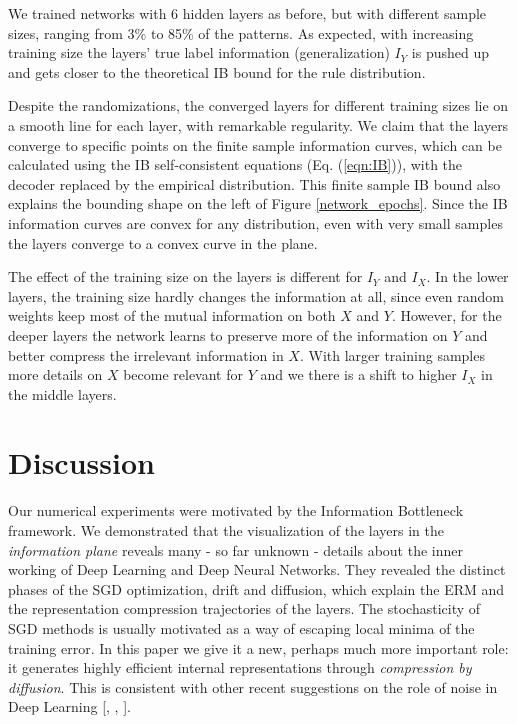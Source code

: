 \documentclass[11pt]{article}
\begin{document}
We trained networks with 6 hidden layers as before, but with different sample sizes, ranging from 3\% to 85\% of the patterns.  
As expected, with increasing training size the layers' true label information (generalization) $I_Y$ is pushed up and 
gets closer to the theoretical IB bound for the rule distribution. 

Despite the randomizations, the converged layers for different training sizes
lie on a smooth line for each layer, with remarkable regularity. We claim that the 
layers converge to specific points on the finite sample information curves, which can be calculated using the IB self-consistent equations (Eq. (\ref{eqn:IB})), with the decoder replaced by the empirical distribution. This finite sample IB bound also explains the bounding shape on the left of Figure \ref{network_epochs}.   
Since the IB information curves are convex for any distribution, even with very small samples the layers converge to a convex curve in the plane. 

The effect of the training size on the layers is different for $I_{Y}$ and $I_{X}$. 
In the lower layers, the training size hardly changes the information at all, since even random weights keep most of the mutual information on both $X$ and $Y$. However, for the deeper layers the
network learns to preserve more of the information on $Y$ and better compress the irrelevant information in $X$. 
With larger training samples more details on $X$ become relevant for $Y$ and we there is a shift to higher $I_X$ in the middle layers. 


\section{Discussion}
\label{Sec:discussion}
Our numerical experiments  were motivated by the Information Bottleneck framework. 
We demonstrated that the visualization of the layers in the \textit{information plane} reveals many - so far unknown - details about the inner working of Deep Learning and Deep Neural Networks. They revealed the distinct phases of the SGD optimization, drift and diffusion, which explain the ERM and the representation compression trajectories of the layers. The stochasticity of SGD methods is usually motivated as a way of escaping local minima of the training error. In this paper we give it a new, perhaps much more important role: it generates highly efficient internal representations through \emph{compression by diffusion}. This is consistent with other recent suggestions on the role of noise in Deep Learning [\citet{2016arXiv161101353A}, \citet{Kadmon2016OptimalAI}, \citet{DBLP:journals/corr/BalduzziFLLMM17}].
\end{document}
